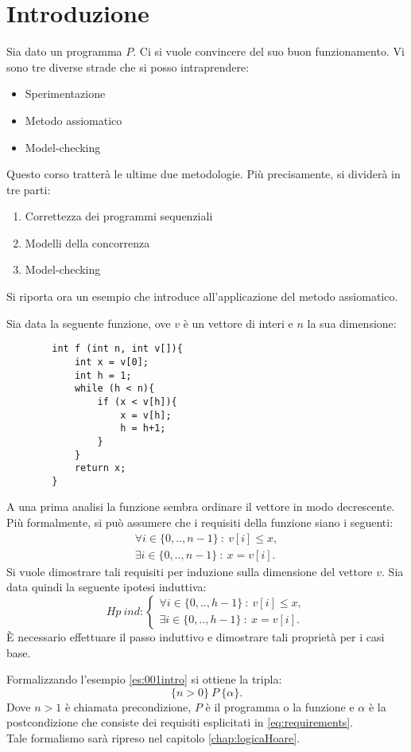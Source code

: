 
\chapter*{Introduzione}
Sia dato un programma $P$. Ci si vuole convincere del suo buon funzionamento. Vi sono tre diverse strade che si posso intraprendere:
\begin{itemize}
	\item Sperimentazione
	\item Metodo assiomatico
	\item Model-checking
\end{itemize}
Questo corso tratter\`a le ultime due metodologie. Pi\`u precisamente, si divider\`a in tre parti:
\begin{enumerate}
	\item Correttezza dei programmi sequenziali
	\item Modelli della concorrenza
	\item Model-checking
\end{enumerate}
Si riporta ora un esempio che introduce all'applicazione del metodo assiomatico.
\begin{es}
	\label{es:001intro}
	Sia data la seguente funzione, ove $v$ \`e un vettore di interi e $n$ la sua dimensione:
	\begin{lstlisting}
		int f (int n, int v[]){
			int x = v[0];
			int h = 1;
			while (h < n){
				if (x < v[h]){
					x = v[h];
					h = h+1;
				}
			}
			return x;
		}
	\end{lstlisting}
A una prima analisi la funzione sembra ordinare il vettore in modo decrescente. Pi\`u formalmente, si pu\`o assumere che i requisiti della funzione siano i seguenti: 
	\begin{equation}
	\label{eq:requirements}
	\begin{array}{rcl}\forall i \in \{0,..,n-1\}\ :\ v[i] \leq x,\\
	\exists i \in \{0,..,n-1\}\ :\ x=v[i].\end{array}
	\end{equation}
	Si vuole dimostrare  tali requisiti per induzione sulla dimensione del vettore $v$. Sia data quindi la seguente ipotesi induttiva: 
	$$ Hp\ ind: \left\{ \begin{array}{rcl}
	 \forall i \in \{0,..,h-1\}\ :\ v[i] \leq x, \\
	\exists i \in \{0,..,h-1\}\ :\ x=v[i].
\end{array} \right. $$
	\`E necessario effettuare il passo induttivo e dimostrare tali propriet\`a per i casi base.
\end{es}

Formalizzando l'esempio \ref{es:001intro} si ottiene la tripla: $$\{n>0\}\ P\ \{\alpha\}.$$
Dove $n>1$ \`e chiamata precondizione, $P$ \`e il programma o la funzione e $\alpha$ \`e la postcondizione che consiste dei requisiti esplicitati in \eqref{eq:requirements}. \\
Tale formalismo sar\`a ripreso nel capitolo \ref{chap:logicaHoare}.